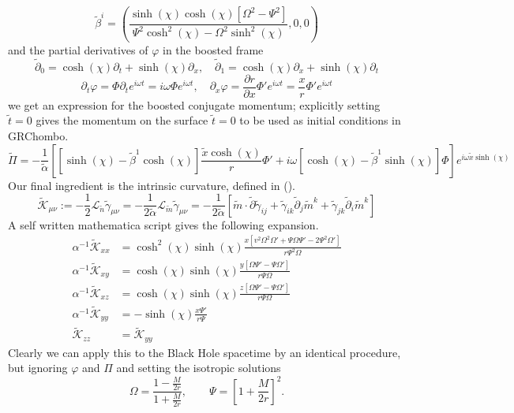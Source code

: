 \documentclass[11pt, oneside]{report}  %
\newcommand{\K}{\mathcal{K}}
\renewcommand{\L}{\mathcal{L}}
\newcommand{\vp}{\varphi}
\numberwithin{equation}{section}
\begin{document}
\begin{equation} \tilde{\beta}^i = \left(\frac{\sinh (\chi)  \cosh (\chi)  \left[\Omega ^2-\Psi ^2\right]}{\Psi ^2 \cosh
   ^2(\chi) -\Omega ^2 \sinh ^2(\chi) },0,0\right)\end{equation}
and the partial derivatives of $\vp$ in the boosted frame
\begin{equation} \tilde{\partial}_{0} = \cosh(\chi) \partial_t + \sinh(\chi) \partial_x,\quad 
\tilde{\partial}_{1} = \cosh(\chi) \partial_x + \sinh(\chi) \partial_t\end{equation} 
 \begin{equation}\partial_t\vp =\Phi\partial_te^{i\omega t} =i\omega \Phi e^{i\omega t},\quad
 \partial_x\vp =\frac{\partial r}{\partial x}\Phi'e^{i\omega t} = \frac{x}{r}\Phi'e^{i\omega t} \end{equation}
we get an expression for the boosted conjugate momentum; explicitly setting $\tilde{t}=0$ gives the momentum on the surface $\tilde{t}=0$ to be used as initial conditions in GRChombo. 
\begin{equation} \widetilde{\Pi} = -\frac{1}{\tilde{\alpha}}\left[  \left[ \sinh(\chi)-\tilde{\beta}^1 \cosh(\chi)\right]\frac{\tilde{x}\cosh(\chi)}{r}\Phi' + i\omega \left[ \cosh(\chi)-\tilde{\beta}^1\sinh(\chi)\right]\Phi\right]e^{i\omega \tilde{x}\sinh(\chi)}\end{equation}
Our final ingredient is the intrinsic curvature, defined in ().
\begin{equation} \widetilde{\K}_{\mu\nu} := -\frac{1}{2}\L_{\tilde{n}}\tilde{\gamma}_{\mu\nu} =-\frac{1}{2\tilde{\alpha}}\L_{\tilde{m}}\tilde{\gamma}_{\mu\nu} = -\frac{1}{2\tilde{\alpha}}\left[ \tilde m \cdot \tilde{\partial}\tilde{\gamma}_{ij} +  \tilde{\gamma}_{ik}\tilde{\partial}_j \tilde{m}^k +\tilde{\gamma}_{jk}\tilde{\partial}_i \tilde{m}^k\right]\end{equation}
A self written mathematica script gives the following expansion.
\begin{align}\alpha^{-1} \widetilde{\K}_{xx} &= \cosh^2(\chi)\sinh(\chi)\frac{x \left[v^2 \Omega^2 \Omega'+\Psi \Omega \Psi'-2 \Psi^2 \Omega'\right]}{r \Psi^2 \Omega}\\
 \alpha^{-1} \widetilde{\K}_{xy} &= \cosh(\chi)\sinh(\chi)\frac{ y \left[\Omega \Psi'- \Psi \Omega'\right]}{r \Psi \Omega }\\
 \alpha^{-1} \widetilde{\K}_{xz} &= \cosh(\chi)\sinh(\chi)\frac{ z \left[\Omega \Psi'- \Psi \Omega'\right]}{r \Psi \Omega }\\
 \alpha^{-1} \widetilde{\K}_{yy} &= -\sinh(\chi)\frac{ x \Psi'}{ r \Psi }\\
\widetilde{\K}_{zz}&=\widetilde{\K}_{yy} \end{align}
Clearly we can apply this to the Black Hole spacetime by an identical procedure, but ignoring $\vp$ and $\Pi$ and setting the isotropic solutions
\begin{equation} \Omega = \frac{1-\frac{M}{2r}}{1+\frac{M}{2r}}, \quad  \quad \Psi = \left[1+\frac{M}{2r}\right]^2.\end{equation}
 
\end{document}
